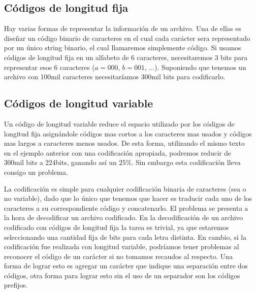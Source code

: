 \subsection{C\'odigos de longitud fija}

Hay varias formas de representar la informaci\'on de un archivo. Una de ellas es dise\~nar un c\'odigo binario de caracteres en el cual cada car\'acter sera representado por un \'unico string binario, el cual llamaremos simplemente c\'odigo. Si usamos c\'odigos de longitud fija en un alfabeto de $6$ caracteres, necesitaremos $3$ bits para representar esos $6$ caracteres ($a=000$, $b=001$, ...). Suponiendo que tenemos un archivo con 100mil caracteres necesitar\'iamos 300mil bits para codificarlo.

\subsection{C\'odigos de longitud variable}

Un c\'odigo de longitud variable reduce el espacio utilizado por los c\'odigos de longitud fija asign\'andole c\'odigos mas cortos a los caracteres mas usados y c\'odigos mas largos a caracteres menos usados. De esta forma, utilizando el mismo texto en el ejemplo anterior con una codificaci\'on apropiada, podremos reducir de 300mil bits a 224bits, ganando as\'i un $25\%$. Sin embargo esta codificaci\'on lleva consigo un problema.

La codificaci\'on es simple para cualquier codificaci\'on binaria de caracteres (sea o no variable), dado que lo \'unico que tenemos que hacer es traducir cada uno de los caracteres a su correspondiente c\'odigo y concatenarlo. El problema se presenta a la hora de decodificar un archivo codificado. En la decodificaci\'on de un archivo codificado con c\'odigos de longitud fija la tarea es trivial, ya que estaremos seleccionando una cantidad fija de bits para cada letra distinta. En cambio, si la codificaci\'on fue realizada con longitud variable, podr\'iamos tener problemas al reconocer el c\'odigo de un car\'acter si no tomamos recaudos al respecto. Una forma de lograr esto es agregar un car\'acter que indique una separaci\'on entre dos c\'odigos, otra forma para lograr esto sin el uso de un separador son los c\'odigos prefijos.

~

